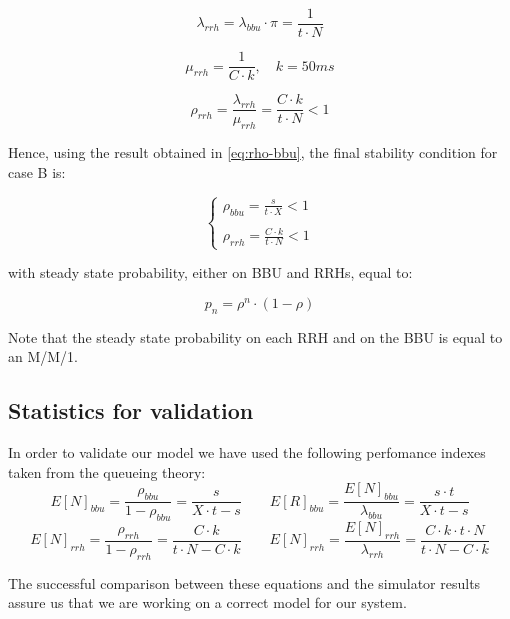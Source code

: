 \documentclass[11pt,a4paper,oneside, openright]{article}
\begin{document}
$$ \lambda_{rrh} = \lambda_{bbu} \cdot \pi = \frac{1}{t \cdot N} $$

$$ \mu_{rrh} = \frac{1}{C \cdot k}, \quad k = 50ms $$

\begin{equation} \label{eq:rho-rrh}
\rho_{rrh} = \frac{\lambda_{rrh}}{\mu_{rrh}} = \frac{C \cdot k}{t \cdot N} < 1
\end{equation}

Hence, using the result obtained in \eqref{eq:rho-bbu}, the final stability condition for case B is:

$$ \begin{cases} \rho_{bbu} = \frac{s}{t \cdot X} < 1 \\ \\ \rho_{rrh} = \frac{C \cdot k}{t \cdot N} < 1 \end{cases} $$

with steady state probability, either on BBU and RRHs, equal to:

$$ p_{n} = \rho^n \cdot (1 - \rho) $$

Note that the steady state probability on each RRH and on the BBU is equal to an M/M/1.

\subsection{Statistics for validation}
In order to validate our model we have used the following perfomance indexes taken from the queueing theory:
\begin{equation}
E[N]_{bbu} = \frac{\rho_{bbu}}{1 - \rho_{bbu}} = \frac{s}{X \cdot t - s} \qquad E[R]_{bbu} = \frac{E[N]_{bbu}}{\lambda_{bbu}} =  \frac{s \cdot t}{X \cdot t - s}
\label{eq:response-time-bbu}
\end{equation}
\begin{equation}
E[N]_{rrh} = \frac{\rho_{rrh}}{1 - \rho_{rrh}} = \frac{C \cdot k}{t \cdot N - C \cdot k} \qquad E[N]_{rrh} = \frac{E[N]_{rrh}}{\lambda_{rrh}} = \frac{C \cdot k \cdot t \cdot N}{t \cdot N - C \cdot k}
\label{eq:response-time-rrh}
\end{equation}



The successful comparison between these equations and the simulator results assure us that we are working on a correct model for our system.
\end{document}
